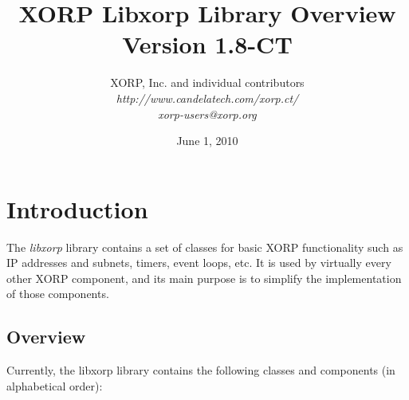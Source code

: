 \documentclass[11pt]{article}
\begin{document}
\title{XORP Libxorp Library Overview \\
\vspace{1ex}
Version 1.8-CT}
\author{ XORP, Inc. and individual contributors		\\
         {\it http://www.candelatech.com/xorp.ct/}			\\
	 {\it xorp-users@xorp.org}
}
\date{June 1, 2010}

\maketitle


\section{Introduction}

The \emph{libxorp} library contains a set of classes for basic
XORP functionality such as IP addresses and subnets, timers, event
loops, etc. It is used by virtually every other XORP component, and
its main purpose is to simplify the implementation of those components.

\subsection{Overview}

Currently, the libxorp library contains the following classes and
components (in alphabetical order):
\end{document}
